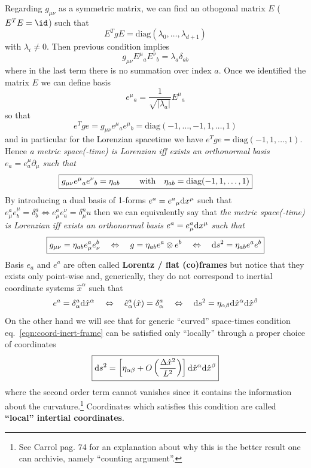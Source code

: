 \documentclass[../main/main.tex]{subfiles}
\begin{document}
Regarding $g_{\mu\nu}$ as a symmetric matrix, we can find an othogonal matrix $E$ ($E^TE=\id$) such that
\[E^TgE=\text{diag}(\lambda_0,\dots,\lambda_{d+1})\]
with $\lambda_i\neq0$. Then previous condition implies
\[g_{\mu\nu}{E^\mu}_a{E^\nu}_b=\lambda_a\delta_{ab}\]
where in the last term there is no summation over index $a$. Once we identified the matrix $E$ we can define basis
\[{e^\mu}_a=\frac1{\sqrt{|\lambda_a|}}{E^\mu}_a\]
so that 
\[e^Tge=g_{\mu\nu}{e^\mu}_a{e^\mu}_b=\text{diag}(-1,\dots,-1,1,\dots,1)\]
and in particular for the Lorenzian spacetime we have $e^Tge=\text{diag}(-1,1,\dots,1)$.
Hence \textit{a metric space(-time) is Lorenzian iff exists an orthonormal basis $e_a=e_a^\mu\partial_\mu$ such that }
\[\boxed{g_{\mu\nu}{e^\mu}_a{e^\nu}_b=\eta_{ab}$ \qquad\text{with}\quad $\eta_{ab}=\text{diag}(-1,1,\dots,1)}\]
By introducing a dual basis of 1-forms $e^a={e^a}_\mu\textup{d} x^\mu$ such that $e^a_\mu e^\mu_b=\delta^a_b\Leftrightarrow e^a_\mu e^\nu_a=\delta_\mu^nu$ then we can equivalently say that \textit{the metric space(-time) is Lorenzian iff exists an orthonormal basis $e^a=e^a_\mu\textup{d} x^\mu$ such that}
\[\boxed{
g_{\mu\nu}=\eta_{ab}e^a_\mu e^b_\nu\quad\Leftrightarrow\quad g=\eta_{ab}e^a\otimes e^b\quad\Leftrightarrow\quad \textup{d} s^2=\eta_{ab}e^a e^b}\]
Basis $e_a$ and $e^a$ are often called \textbf{Lorentz / flat (co)frames} but notice that they exists only point-wise and, generically, they do not correspond to inertial coordinate systems $\hat x^\alpha$ such that 
\begin{equation}\label{eqn:coord-inert-frame}
e^a=\delta^a_\alpha\textup{d}\hat x^\alpha\quad\Leftrightarrow\quad \hat e^a_\alpha(\hat x)=\delta_\alpha^a\quad\Leftrightarrow\quad \textup{d} s^2=\eta_{\alpha\beta}\textup{d}\hat x^\alpha\textup{d}\hat x^\beta
\end{equation}
On the other hand we will see that for generic ``curved'' space-times condition eq.~\eqref{eqn:coord-inert-frame} can be satisfied only ``locally'' through a proper choice of coordinates
\[\boxed{
\textup{d} s^2=\left[\eta_{\alpha\beta}+O\left(\frac{\Delta\hat x^2}{L^2}\right)\right]\textup{d}\hat x^\alpha\textup{d}\hat x^\beta
}\]
where the second order term cannot vanishes since it contains the information about the curvature.\footnote{See \textsf{Carrol} pag. 74 for an explanation about why this is the better result one can archivie, namely ``counting argument''.} Coordinates which satisfies this condition are called \textbf{``local'' intertial coordinates}.
\end{document}
